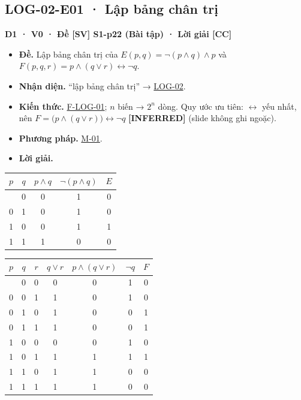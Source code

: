 \documentclass[
  10pt,
  twoside,openany]{book}
\providecommand{\tightlist}{%
  \setlength{\itemsep}{0pt}\setlength{\parskip}{0pt}}
\begin{document}
\hypertarget{LOG-02-E01}{%
\subsection{LOG-02-E01 · Lập bảng chân trị}\label{LOG-02-E01}}

\textbf{D1 · V0 · Đề {[}SV{]} S1-p22 (Bài tập) · Lời giải {[}CC{]}}

\begin{itemize}
\tightlist
\item
  \textbf{Đề.} Lập bảng chân trị của \(E(p,q)=\neg(p\wedge q)\wedge p\)
  và \(F(p,q,r)=p\wedge(q\vee r)\leftrightarrow\neg q\).
\item
  \textbf{Nhận diện.} ``lập bảng chân trị'' →
  \protect\hyperlink{LOG-02}{LOG-02}.
\item
  \textbf{Kiến thức.} \protect\hyperlink{F-LOG-01}{F-LOG-01}; \(n\) biến
  → \(2^n\) dòng. Quy ước ưu tiên: \(\leftrightarrow\) yếu nhất, nên
  \(F=\big(p\wedge(q\vee r)\big)\leftrightarrow\neg q\)
  \textbf{{[}INFERRED{]}} (slide không ghi ngoặc).
\item
  \textbf{Phương pháp.} \protect\hyperlink{M-01}{M-01}.
\item
  \textbf{Lời giải.}
\end{itemize}

\begin{longtable}[]{@{}ccccc@{}}
\toprule\noalign{}
\(p\) & \(q\) & \(p\wedge q\) & \(\neg(p\wedge q)\) & \(E\) \\
\midrule\noalign{}
\endhead
\bottomrule\noalign{}
\endlastfoot
0 & 0 & 0 & 1 & 0 \\
0 & 1 & 0 & 1 & 0 \\
1 & 0 & 0 & 1 & 1 \\
1 & 1 & 1 & 0 & 0 \\
\end{longtable}

\begin{longtable}[]{@{}ccccccc@{}}
\toprule\noalign{}
\(p\) & \(q\) & \(r\) & \(q\vee r\) & \(p\wedge(q\vee r)\) & \(\neg q\)
& \(F\) \\
\midrule\noalign{}
\endhead
\bottomrule\noalign{}
\endlastfoot
0 & 0 & 0 & 0 & 0 & 1 & 0 \\
0 & 0 & 1 & 1 & 0 & 1 & 0 \\
0 & 1 & 0 & 1 & 0 & 0 & 1 \\
0 & 1 & 1 & 1 & 0 & 0 & 1 \\
1 & 0 & 0 & 0 & 0 & 1 & 0 \\
1 & 0 & 1 & 1 & 1 & 1 & 1 \\
1 & 1 & 0 & 1 & 1 & 0 & 0 \\
1 & 1 & 1 & 1 & 1 & 0 & 0 \\
\end{longtable}
\end{document}
